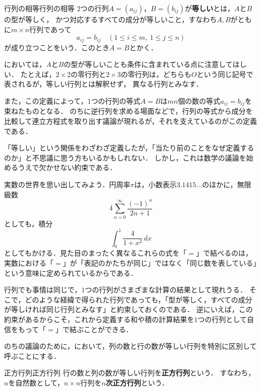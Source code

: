 \begin{definition}{行列の相等}{行列の相等}
  $2$つの行列$A = (a_{ij})$，$B = (b_{ij})$が\textbf{等しい}とは，$A$と$B$の型が等しく，
  かつ対応するすべての成分が等しいこと，すなわち$A,B$がともに$m \times n$行列であって
  \[
    a_{ij} = b_{ij} \quad (1 \le i \le m,~1 \le j \le n)
  \]
  が成り立つことをいう．このとき$A = B$とかく．
\end{definition}
 
においては，$A$と$B$の型が等しいことも条件に含まれている点に注意してほしい．
たとえば，$2 \times 2$の零行列と$2 \times 3$の零行列は，どちらも$O$という同じ記号で表されるが，等しい行列とは解釈せず，
異なる行列とみなす．

\newpage 

また，この定義によって，$1$つの行列の等式$A = B$は$mn$個の数の等式$a_{ij} = b_{ij}$を束ねたものとなる．
のちに逆行列を求める場面などで，行列の等式から成分を比較して連立方程式を取り出す議論が現れるが，それを支えているのがこの定義である．
 
\begin{remark}[行列の相等を考える意義]
  「等しい」という関係をわざわざ定義したが，「当たり前のことをなぜ定義するのか」と不思議に思う方もいるかもしれない．
  しかし，これは数学の議論を始めるうえで欠かせない約束である．
 
  実数の世界を思い出してみよう．円周率$\pi$は，小数表示$3.1415\ldots$のほかに，無限級数
  \[
    4 \sum_{n=0}^{\infty} \frac{(-1)^n}{2n+1}
  \]
  としても，積分
  \[
    \int_0^1 \frac{4}{1 + x^2} \, dx
  \]
  としてもかける．見た目のまったく異なるこれらの式を「$=$」で結べるのは，実数における「$=$」が「表記のかたちが同じ」ではなく「同じ数を表している」という意味に定められているからである．
 
  行列でも事情は同じで，$1$つの行列がさまざまな計算の結果として現れうる．
  そこで，どのような経緯で得られた行列であっても，「型が等しく，すべての成分が等しければ同じ行列とみなす」と約束しておくのである．
  逆にいえば，この約束があるからこそ，これから定義する和や積の計算結果を$1$つの行列として自信をもって「$=$」で結ぶことができる．
\end{remark}

のちの議論のために，において，列の数と行の数が等しい行列を特別に区別して呼ぶことにする．

\begin{definition}{正方行列}{正方行列}
  行の数と列の数が等しい行列を\textbf{正方行列}という．
  すなわち，$n$を自然数として，$n \times n$行列を\textbf{$n$次正方行列}という．
\end{definition}

